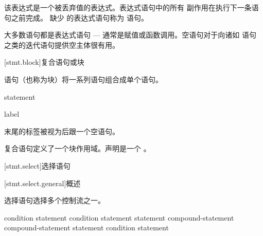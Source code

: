 该表达式是一个被丢弃值的表达式。表达式语句中的所有
%
副作用在执行下一条语句之前完成。
%
缺少  的表达式语句称为  语句。
\begin{note}
大多数语句都是表达式语句 --- 通常是赋值或函数调用。空语句对于向诸如  语句 之类的迭代语句提供空主体很有用。
\end{note}

[stmt.block]{复合语句或块}%
%

\pnum
{} 语句（也称为块）将一系列语句组合成单个语句。

\begin{bnf}
\br
    \terminal{\{}   \terminal{\}}
\end{bnf}

\begin{bnf}
\br
    statement 
\end{bnf}

\begin{bnf}
\br
    label 
\end{bnf}

 末尾的标签被视为后跟一个空语句。

\pnum
\begin{note}
复合语句定义了一个块作用域。声明是一个 。
\end{note}

[stmt.select]{选择语句}%

[stmt.select.general]{概述}%

\pnum
选择语句选择多个控制流之一。

%
%
%
\begin{bnf}
\br
      \terminal{(}  condition \terminal{)} statement\br
      \terminal{(}  condition \terminal{)} statement  statement\br
     \opt{\terminal{!}}  compound-statement\br
     \opt{\terminal{!}}  compound-statement  statement\br
     \terminal{(}  condition \terminal{)} statement
\end{bnf}

